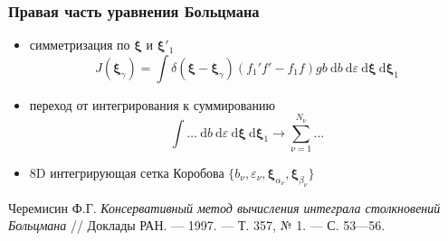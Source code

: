 \documentclass[ucs]{beamer}
\newcommand{\dd}{\:\mathrm{d}}
\begin{document}
\begin{frame}
\begin{columns}[c]
\begin{column}{6cm}
		\end{column}
	\end{columns}
\end{frame}

\begin{frame}
	\frametitle{Правая часть уравнения Больцмана}
	\begin{itemize}
		\item симметризация по \(\boldsymbol\xi\) и \(\boldsymbol\xi'_1\)
			\[
				J(\boldsymbol\xi_\gamma) = \int\delta(\boldsymbol\xi-\boldsymbol\xi_\gamma)
				(f_1' f' - f_1 f) gb \dd{b} \dd\varepsilon \dd\boldsymbol\xi \dd\boldsymbol\xi_1
			\]
		\item переход от интегрирования к суммированию
			\[ \int\dots\dd{b}\dd\varepsilon\dd\boldsymbol\xi\dd\boldsymbol\xi_1 \to \sum\limits_{\nu=1}^{N_\nu}\dots \]
		\item 8D интегрирующая сетка Коробова \( \{b_\nu,\varepsilon_\nu,\boldsymbol\xi_{\alpha_\nu},\boldsymbol\xi_{\beta_\nu}\} \)
	\end{itemize}
	\begin{block}{}\scriptsize
		Черемисин Ф.Г. \textit{Консервативный метод вычисления интеграла столкновений Больцмана}
			// Доклады РАН. — 1997. — Т. 357, № 1. — С. 53—56.
	\end{block}
\end{frame}
\end{document}
